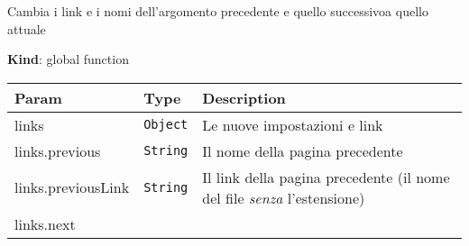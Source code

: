 Cambia i link e i nomi dell'argomento precedente e quello successivoa
quello attuale

\textbf{Kind}: global function

\begin{tabularx}{\textwidth}{XXX}
\toprule
\begin{minipage}[b]{0.30\columnwidth}\raggedright
Param\strut
\end{minipage} & \begin{minipage}[b]{0.30\columnwidth}\raggedright
Type\strut
\end{minipage} & \begin{minipage}[b]{0.30\columnwidth}\raggedright
Description\strut
\end{minipage}\tabularnewline
\midrule
\endhead
\begin{minipage}[t]{0.30\columnwidth}\raggedright
links\strut
\end{minipage} & \begin{minipage}[t]{0.30\columnwidth}\raggedright
\texttt{Object}\strut
\end{minipage} & \begin{minipage}[t]{0.30\columnwidth}\raggedright
Le nuove impostazioni e link\strut
\end{minipage}\tabularnewline
\begin{minipage}[t]{0.30\columnwidth}\raggedright
links.previous\strut
\end{minipage} & \begin{minipage}[t]{0.30\columnwidth}\raggedright
\texttt{String}\strut
\end{minipage} & \begin{minipage}[t]{0.30\columnwidth}\raggedright
Il nome della pagina precedente\strut
\end{minipage}\tabularnewline
\begin{minipage}[t]{0.30\columnwidth}\raggedright
links.previousLink\strut
\end{minipage} & \begin{minipage}[t]{0.30\columnwidth}\raggedright
\texttt{String}\strut
\end{minipage} & \begin{minipage}[t]{0.30\columnwidth}\raggedright
Il link della pagina precedente (il nome del file \emph{senza}
l'estensione)\strut
\end{minipage}\tabularnewline
\begin{minipage}[t]{0.30\columnwidth}\raggedright
links.next\strut
\end{minipage} & \begin{minipage}[t]{0.30\columnwidth}\raggedright

\end{minipage}
\end{tabularx}
